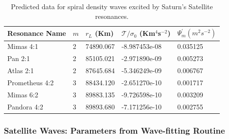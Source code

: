 \documentclass{article}
\begin{document}
\begin{table}
\centering
\begin{tabular}{lllll}
\hline
Resonance Name & $m$ & $r_{L}$ (Km) & $\mathcal{T}/\sigma_{0}$ (Km$^{4}$s$^{-2}$) & $\Psi_{m}^{'} (m^{2}s^{-2})$ \\
\hline
Mimas 4:1 & 2 & 74890.067 & -8.987453e-08 & 0.035125 \\
Pan 2:1 & 2 & 85105.021 & -2.971890e-09 & 0.005273 \\
Atlas 2:1 & 2 & 87645.684 & -5.346249e-09 & 0.006767 \\
Prometheus 4:2 & 3 & 88434.120 & -2.651270e-10 & 0.001717 \\
Mimas 6:2 & 3 & 89883.135 & -9.726598e-10 & 0.003209 \\
Pandora 4:2 & 3 & 89893.680 & -7.171256e-10 & 0.002755 \\
\hline
\end{tabular}
\caption{Predicted data for spiral density waves excited by Saturn's Satellite resonances.}
\end{table}




\subsubsection{Satellite Waves: Parameters from Wave-fitting Routine}


\end{document}
